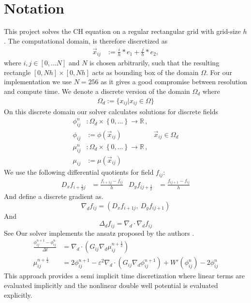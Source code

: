 \documentclass{mimosis}
\begin{document}
\section{Notation}
\label{sec:org2ffcccc}
This project solves the CH equation on a regular rectangular grid with grid-size \(h\). The computational domain, is therefore discretized as
\begin{align}
\label{eq:4}
\vec{x}_{ij} &:= \frac{i}{h} * e_{1} + \frac{j}{h} * e_2,
\end{align}
where \(i,j \in [0 , \dots N]\) and \(N\) is chosen arbitrarily, such that the resulting rectangle \([0 , Nh] \times [0,Nh]\) acts as bounding box of the domain \(\Omega\). For our implementation we use \(N=256\) as it gives a good compromise between resolution and compute time. We denote a discrete version of the domain \(\Omega_d\) where
\begin{align}
\label{eq:8}
\Omega_d := \{x_{ij} | x_{ij} \in \Omega\}
\end{align}
On this discrete domain our solver calculates solutions for discrete fields
\begin{align}
\label{eq:5}
\phi_{ij}^n &: \Omega_d \times \left\{ 0, \dots  \right\} \to \mathbb{R} \,,\\
\phi_{ij} &:= \phi(\vec{x}_{ij}) & \vec{x}_{ij} \in \Omega_{d} \\
\mu_{ij}^n &: \Omega_d \times \left\{ 0, \dots \right\} \to \mathbb{R} \,, \\
\mu_{ij} &:= \mu(\vec{x}_{ij})
\end{align}
We use the following differential quotients for field \(f_{ij}\):
\begin{align}
D_xf_{i+\frac{1}{2} j} &= \frac{f_{i+1j} - f_{ij}}{h} & D_yf_{ij+\frac{1}{2}} &= \frac{f_{ij+1} - f_{ij}}{h}
\end{align}
And define a discrete gradient as.
\begin{equation}
\nabla_d f_{ij} = (D_x f_{i+1j} , \ D_y f_{ij+1})
\end{equation}
And
\begin{equation}
\Delta_d f_{ij} =  \nabla_{d} \cdot \nabla_d f_{ij}
\end{equation}
See \autocite{Ulmer_CHRelaxed_2024}
Our solver implements the ansatz proposed by the authors \autocite{SHIN20117441}.
\begin{equation}
\label{eq:ansatz}
\begin{aligned}
\frac{\phi_{ij}^{n+1} - \phi_{ij}^n}{\Delta t}  &=  \nabla _d \cdot (G_{ij} \nabla_d \mu_{ij}^{n+\frac{1}{2}} )  \\
 \mu_{ij}^{n+\frac{1}{2}} &= 2\phi_{ij}^{n+1} - \varepsilon^2  \nabla_d \cdot  (G_{ij} \nabla _d \phi_{ij}^{n+1} ) + W'(\phi_{ij}^n) - 2\phi _{ij}^n
\end{aligned}
\end{equation}
This approach provides a semi implicit time discretization where linear terms are evaluated implicitly and the nonlinear double well potential is evaluated explicitly.
\end{document}
